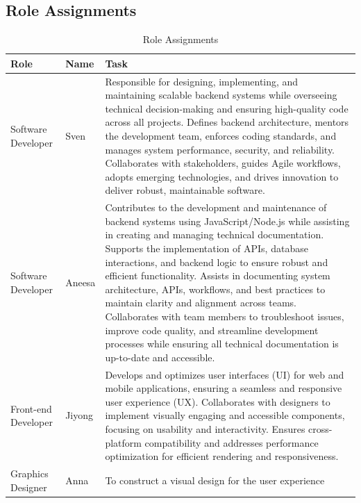 \documentclass[conference]{IEEEtran}
\begin{document}
\subsection{Role Assignments}
\begin{table}[H]
    \centering
    \caption{Role Assignments}
    \begin{adjustbox}{max width=\textwidth}
        \begin{tabular}{|>{\centering\arraybackslash}m{1.2cm}|>{\centering\arraybackslash}m{1.2cm}|m{5cm}|}
            \hline
            \textbf{ Role} & \textbf{ Name} & \textbf{ Task} \\
            \hline
            Software Developer & Sven & Responsible for designing, implementing, and maintaining scalable backend systems while overseeing technical decision-making and ensuring high-quality code across all projects. Defines backend architecture, mentors the development team, enforces coding standards, and manages system performance, security, and reliability. Collaborates with stakeholders, guides Agile workflows, adopts emerging technologies, and drives innovation to deliver robust, maintainable software. \\
            \hline
            Software Developer & Aneesa &Contributes to the development and maintenance of backend systems using JavaScript/Node.js while assisting in creating and managing technical documentation. Supports the implementation of APIs, database interactions, and backend logic to ensure robust and efficient functionality. Assists in documenting system architecture, APIs, workflows, and best practices to maintain clarity and alignment across teams. Collaborates with team members to troubleshoot issues, improve code quality, and streamline development processes while ensuring all technical documentation is up-to-date and accessible. \\
            \hline
            Front-end Developer & Jiyong & Develops and optimizes user interfaces (UI) for web and mobile applications, ensuring a seamless and responsive user experience (UX). Collaborates with designers to implement visually engaging and accessible components, focusing on usability and interactivity.
            Ensures cross-platform compatibility and addresses performance optimization for efficient rendering and responsiveness.\\
            \hline
            Graphics Designer & Anna & To construct a visual design for the user experience  \\
            \hline
        \end{tabular}
    \end{adjustbox}
\end{table}
\end{document}
